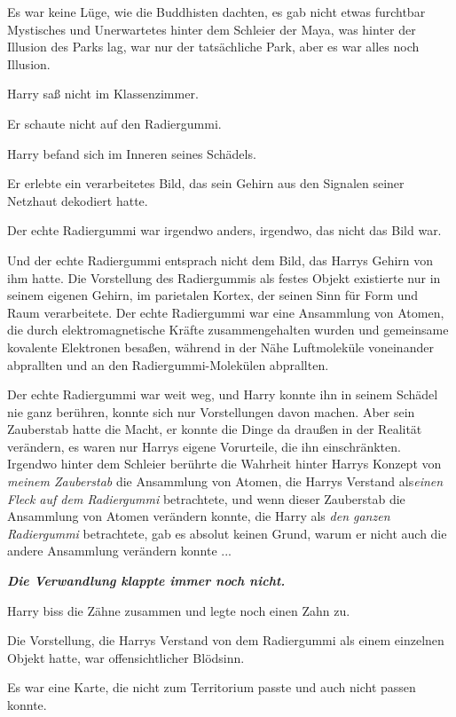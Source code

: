 Es war keine Lüge, wie die Buddhisten dachten, es gab nicht etwas furchtbar
Mystisches und Unerwartetes hinter dem Schleier der Maya, was hinter der
Illusion des Parks lag, war nur der tatsächliche Park, aber es war alles noch
Illusion.

Harry saß nicht im Klassenzimmer.

Er schaute nicht auf den Radiergummi.

Harry befand sich im Inneren seines Schädels.

Er erlebte ein verarbeitetes Bild, das sein Gehirn aus den Signalen seiner
Netzhaut dekodiert hatte.

Der echte Radiergummi war irgendwo anders, irgendwo, das nicht das Bild war.

Und der echte Radiergummi entsprach nicht dem Bild, das Harrys Gehirn von ihm
hatte. Die Vorstellung des Radiergummis als festes Objekt existierte nur in
seinem eigenen Gehirn, im parietalen Kortex, der seinen Sinn für Form und Raum
verarbeitete. Der echte Radiergummi war eine Ansammlung von Atomen, die durch
elektromagnetische Kräfte zusammengehalten wurden und gemeinsame kovalente
Elektronen besaßen, während in der Nähe Luftmoleküle voneinander abprallten und
an den Radiergummi-Molekülen abprallten.

Der echte Radiergummi war weit weg, und Harry konnte ihn in seinem Schädel nie
ganz berühren, konnte sich nur Vorstellungen davon machen. Aber sein Zauberstab
hatte die Macht, er konnte die Dinge da draußen in der Realität verändern, es
waren nur Harrys eigene Vorurteile, die ihn einschränkten. Irgendwo hinter dem
Schleier berührte die Wahrheit hinter Harrys Konzept von \emph{\glqq{}meinem
Zauberstab\grqq{}} die Ansammlung von Atomen, die Harrys Verstand
als\emph{\glqq{}einen Fleck auf dem Radiergummi\grqq{}} betrachtete, und wenn
dieser Zauberstab die Ansammlung von Atomen verändern konnte, die Harry als
\emph{\glqq{}den ganzen Radiergummi\grqq{}} betrachtete, gab es absolut keinen
Grund, warum er nicht auch die andere Ansammlung verändern konnte ...

\textbf{\emph{Die Verwandlung klappte immer noch nicht.}}

Harry biss die Zähne zusammen und legte noch einen Zahn zu.

Die Vorstellung, die Harrys Verstand von dem Radiergummi als einem einzelnen
Objekt hatte, war offensichtlicher Blödsinn.

Es war eine Karte, die nicht zum Territorium passte und auch nicht passen
konnte.


